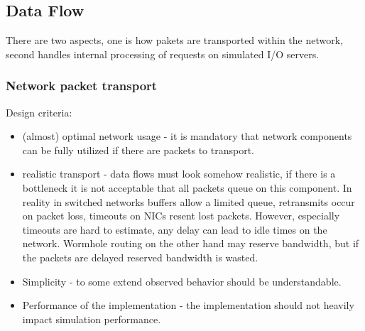 \documentclass[
     11pt,         %
     a4paper,      %
     BCOR10mm,     %
     DIV14,        %
     liststotoc,   %
     bibtotoc,     %
     idxtotoc,     %
     parskip       %
     ]{scrreprt}   %
\begin{document}
\subsection{Data Flow}
There are two aspects, one is how pakets are transported within the network, second handles internal processing of requests on simulated I/O servers.

\subsubsection{Network packet transport}
Design criteria: 
\begin{itemize}
 \item (almost) optimal network usage - it is mandatory that network components can be fully utilized if there are packets to transport.
 \item realistic transport - data flows must look somehow realistic, if there is a bottleneck it is not acceptable that all packets queue on this component. 
  In reality in switched networks buffers allow a limited queue, retransmits occur on packet loss, timeouts on NICs resent lost packets. 
  However, especially timeouts are hard to estimate, any delay can lead to idle times on the network.
  Wormhole routing on the other hand may reserve bandwidth, but if the packets are delayed reserved bandwidth is wasted.   
 \item Simplicity - to some extend observed behavior should be understandable.
 \item Performance of the implementation - the implementation should not heavily impact simulation performance.
\end{itemize}
\end{document}
